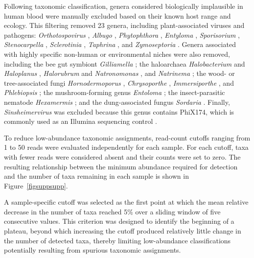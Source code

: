 \begin{bibunit}[apalike]
\begin{appendices}
Following taxonomic classification, genera considered biologically implausible in human blood were manually excluded based on their known host range and ecology. This filtering removed 23 genera, including plant-associated viruses and pathogens: \textit{Orthotospovirus} \citep{kormelink_bunyavirales_2021}, \textit{Albugo} \citep{kemen_gene_2011}, \textit{Phytophthora} \citep{meng_phytophthora_2014}, \textit{Entyloma} \citep{kruse_broad_2018}, \textit{Sporisorium} \citep{zhao_sporisorium_2022}, \textit{Stenocarpella} \citep{health_plh_pest_2022}, \textit{Sclerotinia} \citep{derbyshire_evolutionary_2022}, \textit{Taphrina} \citep{nigon_exploring_2026}, and \textit{Zymoseptoria} \citep{quaedvlieg_zymoseptoria_2011}. Genera associated with highly specific non-human or environmental niches were also removed, including the bee gut symbiont \textit{Gilliamella} \citep{kwong_evolution_2015}; the haloarchaea \textit{Halobacterium} and \textit{Haloplanus} \citep{fendrihan_extremely_2006}, \textit{Halorubrum} and \textit{Natronomonas} \citep{kamekura_diversity_1998}, and \textit{Natrinema} \citep{strakova_natrinema_2023}; the wood- or tree-associated fungi \textit{Hornodermoporus} \citep{yuan_species_2023}, \textit{Chrysoporthe} \citep{van_der_nest_ima_2021}, \textit{Immersiporthe} \citep{chen_serious_2013}, and \textit{Phlebiopsis} \citep{iwata_omics_2021}; the mushroom-forming genus \textit{Entoloma} \citep{liu_additions_2025}; the insect-parasitic nematode \textit{Hexamermis} \citep{poinar_hexamermis_1985,lee_hexamermis_2026}; and the dung-associated fungus \textit{Sordaria} \citep{newcombe_revisiting_2016}. Finally, \textit{Sinsheimervirus} was excluded because this genus contains PhiX174, which is commonly used as an Illumina sequencing control \citep{illumina_phix_control}. 

To reduce low-abundance taxonomic assignments, read-count cutoffs ranging from 1 to 50 reads were evaluated independently for each sample. For each cutoff, taxa with fewer reads were considered absent and their counts were set to zero. The resulting relationship between the minimum abundance required for detection and the number of taxa remaining in each sample is shown in Figure~\ref{figsuppsupp}.

A sample-specific cutoff was selected as the first point at which the mean relative decrease in the number of taxa reached 5\% over a sliding window of five consecutive values. This criterion was designed to identify the beginning of a plateau, beyond which increasing the cutoff produced relatively little change in the number of detected taxa, thereby limiting low-abundance classifications potentially resulting from spurious taxonomic assignments.


\end{appendices}
\end{bibunit}
